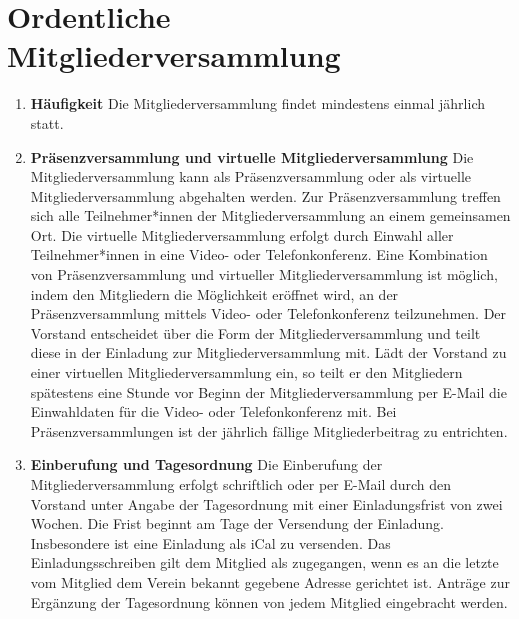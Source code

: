 \documentclass{scrartcl}
\begin{document}
    \section{Ordentliche Mitgliederversammlung}
        \begin{enumerate}
            \item \textbf{Häufigkeit} \newline
                Die Mitgliederversammlung findet mindestens einmal jährlich statt.
            \item \textbf{Präsenzversammlung und virtuelle Mitgliederversammlung} \newline
                Die Mitgliederversammlung kann als Präsenzversammlung oder als virtuelle
                Mitgliederversammlung abgehalten werden. Zur Präsenzversammlung treffen sich alle
                Teilnehmer*innen der Mitgliederversammlung an einem gemeinsamen Ort. Die virtuelle
                Mitgliederversammlung erfolgt durch Einwahl aller Teilnehmer*innen in eine Video- oder
                Telefonkonferenz. Eine Kombination von Präsenzversammlung und virtueller
                Mitgliederversammlung ist möglich, indem den Mitgliedern die Möglichkeit eröffnet wird, an der
                Präsenzversammlung mittels Video- oder Telefonkonferenz teilzunehmen. Der Vorstand
                entscheidet über die Form der Mitgliederversammlung und teilt diese in der Einladung zur
                Mitgliederversammlung mit. Lädt der Vorstand zu einer virtuellen Mitgliederversammlung ein,
                so teilt er den Mitgliedern spätestens eine Stunde vor Beginn der Mitgliederversammlung per
                E-Mail die Einwahldaten für die Video- oder Telefonkonferenz mit.
                Bei Präsenzversammlungen ist der jährlich fällige Mitgliederbeitrag zu entrichten.
            \item \textbf{Einberufung und Tagesordnung} \newline
                Die Einberufung der Mitgliederversammlung erfolgt schriftlich oder per E-Mail durch den
                Vorstand unter Angabe der Tagesordnung mit einer Einladungsfrist von zwei Wochen. Die
                Frist beginnt am Tage der Versendung der Einladung.
                Insbesondere ist eine Einladung als iCal zu versenden.
                Das Einladungsschreiben gilt dem Mitglied als zugegangen, wenn es an die letzte vom Mitglied dem Verein bekannt gegebene
                Adresse gerichtet ist.
                Anträge zur Ergänzung der Tagesordnung können von jedem Mitglied eingebracht werden.

\end{enumerate}
\end{document}
